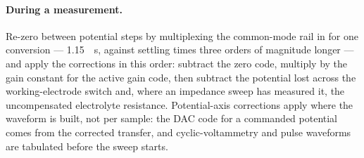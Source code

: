 \paragraph{During a measurement.} Re-zero between potential steps by
multiplexing the common-mode rail in for one conversion --- \SI{1.15}{\micro
\second}, against settling times three orders of magnitude longer --- and apply
the corrections in this order: subtract the zero code, multiply by the gain
constant for the active gain code, then subtract the potential lost across the
working-electrode switch and, where an impedance sweep has measured it, the
uncompensated electrolyte resistance. Potential-axis corrections apply where the
waveform is built, not per sample: the DAC code for a commanded potential comes
from the corrected transfer, and cyclic-voltammetry and pulse waveforms are
tabulated before the sweep starts.
